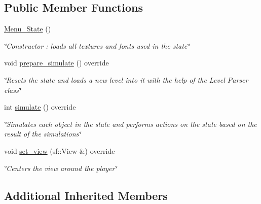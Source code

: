 \subsection*{Public Member Functions}
\begin{DoxyCompactItemize}
\item 
\hypertarget{classMenu__State_abcb7829ec9a970e44efa5c235e988cfb}{\hyperlink{classMenu__State_abcb7829ec9a970e44efa5c235e988cfb}{Menu\+\_\+\+State} ()}\label{classMenu__State_abcb7829ec9a970e44efa5c235e988cfb}

\begin{DoxyCompactList}\small\item\em \char`\"{}\+Constructor \+: loads all textures and fonts used in the state\char`\"{} \end{DoxyCompactList}\item 
\hypertarget{classMenu__State_a654017b2f4425a4d2e2827bc35c113eb}{void \hyperlink{classMenu__State_a654017b2f4425a4d2e2827bc35c113eb}{prepare\+\_\+simulate} () override}\label{classMenu__State_a654017b2f4425a4d2e2827bc35c113eb}

\begin{DoxyCompactList}\small\item\em \char`\"{}\+Resets the state and loads a new level into it with the help
        of the Level Parser class\char`\"{} \end{DoxyCompactList}\item 
int \hyperlink{classMenu__State_a8c8cd24b56f7123085195accaa6e1a48}{simulate} () override
\begin{DoxyCompactList}\small\item\em \char`\"{}\+Simulates each object in the state and performs actions on
        the state based on the result of the simulations\char`\"{} \end{DoxyCompactList}\item 
void \hyperlink{classMenu__State_a7a65c4db5146110cb6597b69226c4f1b}{set\+\_\+view} (sf\+::\+View \&) override
\begin{DoxyCompactList}\small\item\em \char`\"{}\+Centers the view around the player\char`\"{} \end{DoxyCompactList}\end{DoxyCompactItemize}
\subsection*{Additional Inherited Members}


